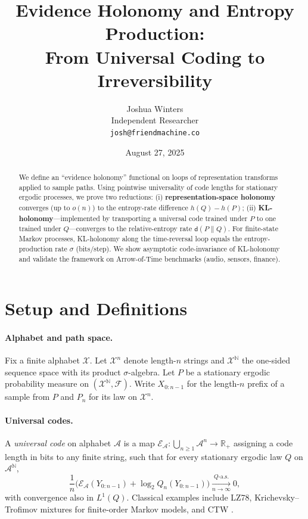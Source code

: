\documentclass[11pt]{article}
\title{Evidence Holonomy and Entropy Production:\\
From Universal Coding to Irreversibility}
\author{Joshua Winters\\Independent Researcher\\\texttt{josh@friendmachine.co}}
\date{August 27, 2025}
\newcommand{\X}{\mathcal{X}}
\newcommand{\N}{\mathbb{N}}
\newcommand{\1}{\mathbbm{1}}
\newcommand{\code}{\mathcal{E}}
\newcommand{\RR}{\mathbb{R}}
\begin{document}
\maketitle

\begin{abstract}
We define an ``evidence holonomy'' functional on loops of representation transforms applied to sample paths. Using pointwise universality of code lengths for stationary ergodic processes, we prove two reductions: (i) \textbf{representation-space holonomy} converges (up to $o(n)$) to the entropy-rate difference $h(Q)-h(P)$; (ii) \textbf{KL-holonomy}—implemented by transporting a universal code trained under $P$ to one trained under $Q$—converges to the relative-entropy rate $\mathsf{d}(P\|Q)$. For finite-state Markov processes, KL-holonomy along the time-reversal loop equals the entropy-production rate $\sigma$ (bits/step). We show asymptotic code-invariance of KL-holonomy and validate the framework on Arrow-of-Time benchmarks (audio, sensors, finance).
\end{abstract}

\section{Setup and Definitions}

\paragraph{Alphabet and path space.} Fix a finite alphabet $\X$. Let $\X^n$ denote length-$n$ strings and $\X^{\N}$ the one-sided sequence space with its product $\sigma$-algebra. Let $P$ be a stationary ergodic probability measure on $(\X^{\N},\mathcal{F})$. Write $X_{0:n-1}$ for the length-$n$ prefix of a sample from $P$ and $P_n$ for its law on $\X^n$.

\paragraph{Universal codes.}
A \emph{universal code} on alphabet $\mathcal{A}$ is a map $\code_{\mathcal{A}}:\bigcup_{n\ge 1}\mathcal{A}^n\to \RR_+$ assigning a code length in bits to any finite string, such that for every stationary ergodic law $Q$ on $\mathcal{A}^{\N}$,
\begin{equation}\label{eq:universality}
\frac{1}{n}\Big(\code_{\mathcal{A}}(Y_{0:n-1}) + \log_2 Q_n(Y_{0:n-1})\Big) \xrightarrow[n\to\infty]{Q\text{-a.s.}} 0,
\end{equation}
with convergence also in $L^1(Q)$. Classical examples include LZ78, Krichevsky--Trofimov mixtures for finite-order Markov models, and CTW \cite{ziv1978,kt1981,willems1995ctw,shields1996,csiszarshields2004}.
\end{document}
